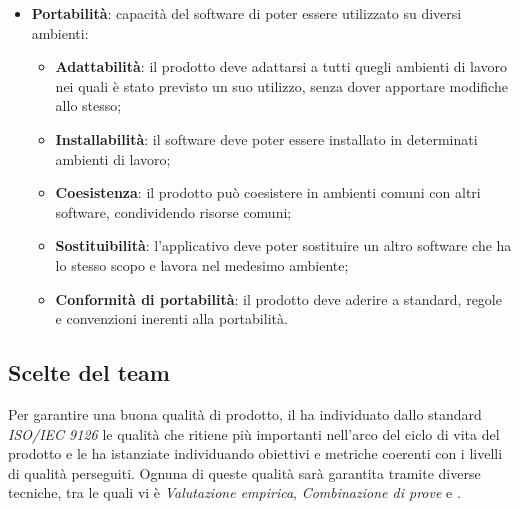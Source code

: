 \begin{itemize}
	\item\textbf{Portabilità}: capacità del software di poter essere utilizzato su diversi ambienti:
	\begin{itemize}
		\item\textbf{Adattabilità}: il prodotto deve adattarsi a tutti quegli ambienti di lavoro nei quali è stato previsto un suo utilizzo, senza dover apportare modifiche allo stesso;
		\item\textbf{Installabilità}: il software deve poter essere installato in determinati ambienti di lavoro;
		\item\textbf{Coesistenza}: il prodotto può coesistere in ambienti comuni
con altri software, condividendo risorse comuni;
		\item\textbf{Sostituibilità}: l'applicativo deve poter sostituire un altro software che ha lo stesso scopo e lavora nel medesimo ambiente;
		\item\textbf{Conformità di portabilità}: il prodotto deve aderire a standard, regole e convenzioni inerenti alla portabilità.
	\end{itemize}
\end{itemize}

\subsection{Scelte del team}
Per garantire una buona qualità di prodotto, il  ha individuato dallo standard \textit{ISO/IEC 9126} le qualità che ritiene più importanti nell'arco del ciclo di vita del prodotto e le ha istanziate individuando obiettivi e metriche coerenti con i livelli di qualità perseguiti. Ognuna di queste qualità sarà garantita tramite diverse tecniche, tra le quali vi è \textit{Valutazione empirica}, \textit{Combinazione di prove} e .

\newpage